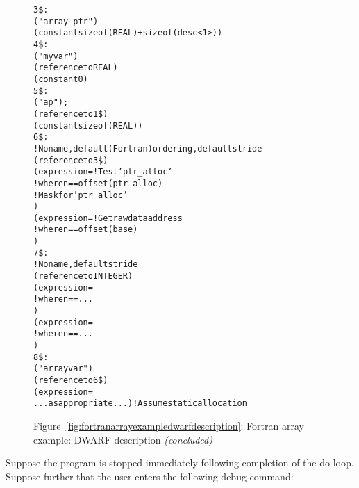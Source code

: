 \begin{figure}
\begin{dwflisting}
\begin{alltt}
3\$: \DWTAGstructuretype
        \DWATname("array\_ptr")
        \DWATbytesize(constant sizeof(REAL) + sizeof(desc<1>))
4\$:     \DWTAGmember
            \DWATname("myvar")
            \DWATtype(reference to REAL)
            \DWATdatamemberlocation(constant 0)
5\$:     \DWTAGmember
            \DWATname("ap");
            \DWATtype(reference to 1\$)
            \DWATdatamemberlocation(constant sizeof(REAL))
6\$: \DWTAGarraytype
        ! No name, default (Fortran) ordering, default stride
        \DWATtype(reference to 3\$)
        \DWATallocated(expression=       ! Test 'ptr\_alloc' 
            \DWOPpushobjectaddress
            \DWOPlitn                  ! where n == offset(ptr\_alloc)
            \DWOPplus
            \DWOPderef
            \DWOPlittwo                    ! Mask for 'ptr\_alloc' 
            \DWOPand)
        \DWATdatalocation(expression=   ! Get raw data address
            \DWOPpushobjectaddress
            \DWOPlitn                  ! where n == offset(base)
            \DWOPplus
            \DWOPderef)
7\$:     \DWTAGsubrangetype
            ! No name, default stride
            \DWATtype(reference to INTEGER)
            \DWATlowerbound(expression=
                \DWOPpushobjectaddress
                \DWOPlitn              ! where n == ...
                \DWOPplus
                \DWOPderef)
            \DWATupperbound(expression=
                \DWOPpushobjectaddress
                \DWOPlitn              ! where n == ...
                \DWOPplus
                \DWOPderef)
8\$: \DWTAGvariable
        \DWATname("arrayvar")
        \DWATtype(reference to 6\$)
        \DWATlocation(expression=
            ...as appropriate...)       ! Assume static allocation
\end{alltt}
\end{dwflisting}
\begin{center}
\vspace{3mm}
Figure~\ref{fig:fortranarrayexampledwarfdescription}: Fortran array example: DWARF description \textit{(concluded)}
\end{center}
\end{figure}

Suppose 
the program is stopped immediately following completion
of the do loop. Suppose further that the user enters the
following debug command:

